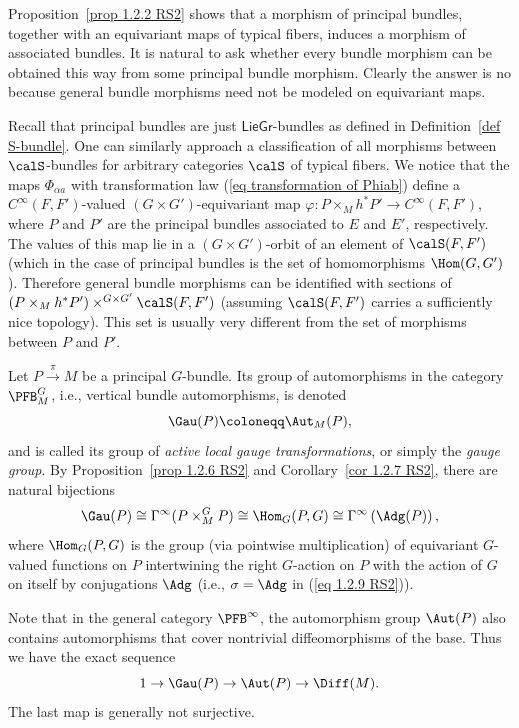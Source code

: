 \begin{rem}
    Proposition~\ref{prop 1.2.2 RS2} shows that a morphism of principal bundles, together with an equivariant maps of typical fibers, induces a morphism of associated bundles. It is natural to ask whether every bundle morphism can be obtained this way from some principal bundle morphism. Clearly the answer is no because general bundle morphisms need not be modeled on equivariant maps.
    
    Recall that principal bundles are just $\mathsf{LieGr}$-bundles as defined in Definition~\ref{def S-bundle}. One can similarly approach a classification of all morphisms between $\calS$-bundles for arbitrary categories $\calS$ of typical fibers. We notice that the maps $\Phi_{\alpha a}$ with transformation law (\ref{eq transformation of Phiab}) define a $C^\infty(F,F')$-valued $(G\times G')$-equivariant map $\varphi:P\times_M h^\ast P'\to C^\infty(F,F')$, where $P$ and $P'$ are the principal bundles associated to $E$ and $E'$, respectively. The values of this map lie in a $(G\times G')$-orbit of an element of $\calS(F,F')$ (which in the case of principal bundles is the set of homomorphisms $\Hom(G,G')$). Therefore general bundle morphisms can be identified with sections of $(P\times_M h^\ast P')\times^{G\times G'}\calS(F,F')$ (assuming $\calS(F,F')$ carries a sufficiently nice topology). This set is usually very different from the set of morphisms between $P$ and $P'$.
\end{rem}

\begin{defn}
    Let $P\overset{\pi}{\to}M$ be a principal $G$-bundle. Its group of automorphisms in the category $\PFB^G_M$, i.e., vertical bundle automorphisms, is denoted 
    \[\Gau(P)\coloneqq \Aut_M(P),\]
    and is called its group of \emph{active local gauge transformations}, or simply the \emph{gauge group}. By Proposition~\ref{prop 1.2.6 RS2} and Corollary~\ref{cor 1.2.7 RS2}, there are natural bijections \[\Gau(P)\cong \Gamma^\infty(P\times^G_MP)\cong \Hom_G(P,G)\cong \Gamma^\infty\left(\Adg(P)\right),\]
    where $\Hom_G(P,G)$ is the group (via pointwise multiplication) of equivariant $G$-valued functions on $P$ intertwining the right $G$-action on $P$ with the action of $G$ on itself by conjugations $\Adg$ (i.e., $\sigma=\Adg$ in (\ref{eq 1.2.9 RS2})).
\end{defn}

Note that in the general category $\PFB^\infty$, the automorphism group $\Aut(P)$ also contains automorphisms that cover nontrivial diffeomorphisms of the base. Thus we have the exact sequence
\[1\to \Gau(P)\to \Aut(P)\to \Diff(M).\]
The last map is generally not surjective. 

